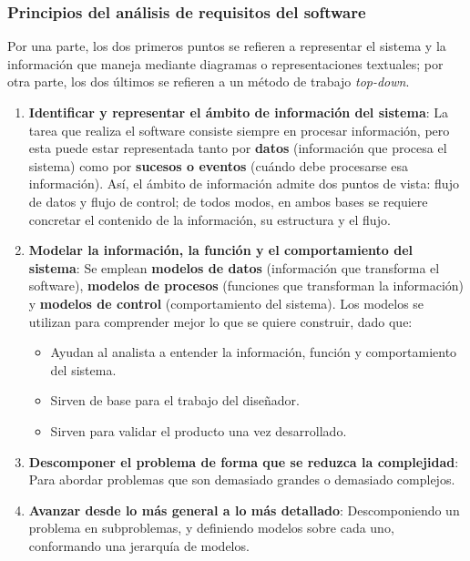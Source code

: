 \subsubsection{Principios del análisis de requisitos del software}

Por una parte, los dos primeros puntos se refieren a representar el sistema y la información que maneja mediante diagramas o representaciones textuales; por otra parte, los dos últimos se refieren a un método de trabajo \textit{top-down}.

\begin{enumerate}
    \item \textbf{Identificar y representar el ámbito de información del sistema}: La tarea que realiza el software consiste siempre en procesar información, pero esta puede estar representada tanto por \textbf{datos} (información que procesa el sistema) como por \textbf{sucesos o eventos} (cuándo debe procesarse esa información). Así, el ámbito de información admite dos puntos de vista: flujo de datos y flujo de control; de todos modos, en ambos bases se requiere concretar el contenido de la información, su estructura y el flujo.
    \item \textbf{Modelar la información, la función y el comportamiento del sistema}: Se emplean \textbf{modelos de datos} (información que transforma el software), \textbf{modelos de procesos} (funciones que transforman la información) y \textbf{modelos de control} (comportamiento del sistema). Los modelos se utilizan para comprender mejor lo que se quiere construir, dado que:
          \begin{itemize}
              \item Ayudan al analista a entender la información, función y comportamiento del sistema.
              \item Sirven de base para el trabajo del diseñador.
              \item Sirven para validar el producto una vez desarrollado.
          \end{itemize}
    \item \textbf{Descomponer el problema de forma que se reduzca la complejidad}: Para abordar problemas que son demasiado grandes o demasiado complejos.
    \item \textbf{Avanzar desde lo más general a lo más detallado}: Descomponiendo un problema en subproblemas, y definiendo modelos sobre cada uno, conformando una jerarquía de modelos.
\end{enumerate}


